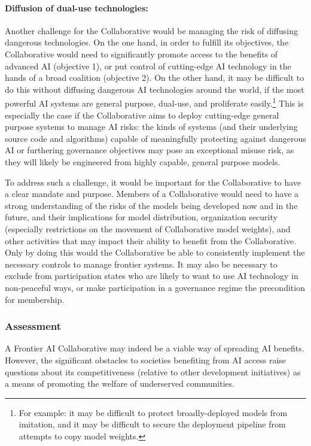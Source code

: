 \documentclass[12pt]{article}
\begin{document}
\paragraph{Diffusion of dual-use technologies:} Another challenge for the
Collaborative would be managing the risk of diffusing dangerous
technologies. On the one hand, in order to fulfill its objectives, the
Collaborative would need to significantly promote access to the benefits
of advanced AI (objective 1), or put control of cutting-edge AI
technology in the hands of a broad coalition (objective 2). On the other
hand, it may be difficult to do this without diffusing dangerous AI
technologies around the world, if the most powerful AI systems are
general purpose, dual-use, and proliferate easily.\footnote{For example:
it may be difficult to protect broadly-deployed models from imitation,
and it may be difficult to secure the deployment pipeline from
attempts to copy model weights.} This is especially the
case if the Collaborative aims to deploy cutting-edge general purpose
systems to manage AI risks: the kinds of systems (and their underlying
source code and algorithms) capable of meaningfully protecting against
dangerous AI or furthering governance objectives may pose an exceptional
misuse risk, as they will likely be engineered from highly capable,
general purpose models.

To address such a challenge, it would be important for the Collaborative
to have a clear mandate and purpose. Members of a Collaborative would
need to have a strong understanding of the risks of the models being
developed now and in the future, and their implications for model
distribution, organization security (especially restrictions on the
movement of Collaborative model weights), and other activities that may
impact their ability to benefit from the Collaborative. Only by doing
this would the Collaborative be able to consistently implement the
necessary controls to manage frontier systems. It may also be necessary
to exclude from participation states who are likely to want to use AI
technology in non-peaceful ways, or make participation in a governance
regime the precondition for membership.


\subsubsection*{Assessment}

A Frontier AI Collaborative may indeed be a viable way of spreading AI
benefits. However, the significant obstacles to societies benefiting
from AI access raise questions about its competitiveness (relative to
other development initiatives) as a means of promoting the welfare of
underserved communities.
\end{document}
